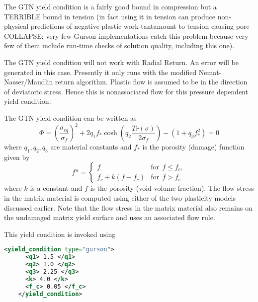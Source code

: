  The GTN yield condition is a fairly good bound in compression but a
  TERRIBLE bound in tension (in fact using it in tension can produce
  non-physical predictions of negative plastic work tantamount to
  tension causing pore COLLAPSE; very few Gurson implementations catch
  this problem because very few of them include run-time checks of
  solution quality, including this one).

  The GTN yield condition will not work with Radial Return.  An error
  will be generated in this case.  Presently it only runs with the
  modified Nemat-Nasser/Maudlin return algorithm.  Plastic flow is
  assumed to be in the direction of deviatoric stress.  Hence this
  is nonassociated flow for this pressure dependent yield condition.

  The GTN yield condition can be written as
  \begin{equation}
    \Phi = \left(\frac{\sigma_{eq}}{\sigma_f}\right)^2 +
    2 q_1 f_* \cosh \left(q_2 \frac{Tr(\sigma)}{2\sigma_f}\right) -
    (1+q_3 f_*^2) = 0
  \end{equation}
  where $q_1,q_2,q_3$ are material constants and $f_*$ is the porosity
  (damage) function given by
  \begin{equation}
    f* = 
    \begin{cases}
      f & \text{for}~~ f \le f_c,\\ 
      f_c + k (f - f_c) & \text{for}~~ f > f_c 
    \end{cases}
  \end{equation}
  where $k$ is a constant and $f$ is the porosity (void volume fraction).  The
  flow stress in the matrix material is computed using either of the two
  plasticity models discussed earlier.  Note that the flow stress in the matrix
  material also remains on the undamaged matrix yield surface and uses an
  associated flow rule.

  This yield condition is invoked using
  \begin{lstlisting}[language=XML]
    <yield_condition type="gurson">
      <q1> 1.5 </q1>
      <q2> 1.0 </q2>
      <q3> 2.25 </q3>
      <k> 4.0 </k>
      <f_c> 0.05 </f_c>
    </yield_condition>
  \end{lstlisting}


